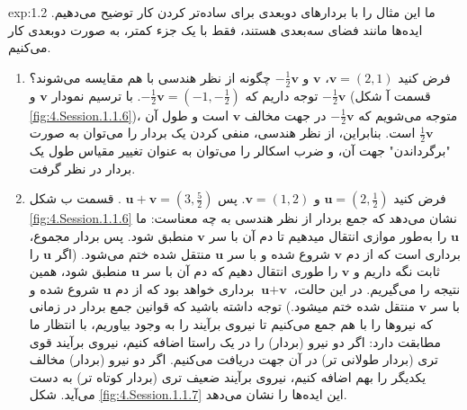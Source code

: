 {\begin{spacing}{1.5}
        \textbf{\vspace{-20pt}}
        \begin{example}{exp:1.2}
            \Large
            ما این مثال را با بردارهای دوبعدی برای ساده‌تر کردن کار توضیح می‌دهیم. ایده‌ها مانند فضای سه‌بعدی هستند، فقط با یک جزء کمتر، به صورت دو‌بعدی کار می‌کنیم.\\
            \begin{enumerate}[label=\textbf{\arabic*}.]
                \item {فرض کنید $\textbf{v}=(2,1)$، $\textbf{v}$ و $-\frac{\displaystyle 1}{\displaystyle 2}\textbf{v}$ چگونه از نظر هندسی با هم مقایسه می‌شوند؟
                توجه داریم که $-\frac{\displaystyle 1}{\displaystyle 2}\textbf{v}=(-1,-\frac{\displaystyle 1}{\displaystyle 2})$.
                با ترسیم نمودار $\textbf{v}$ و $-\frac{\displaystyle 1}{\displaystyle 2}\textbf{v}$ (قسمت آ شکل \ref{fig:4.Session.1.1.6})،
                متوجه می‌شویم که $-\frac{\displaystyle 1}{\displaystyle 2}\textbf{v}$ در جهت مخالف $\textbf{v}$ است و طول آن $\frac{\displaystyle 1}{\displaystyle 2}\textbf{v}$ است.
                بنابراین، از نظر هندسی، منفی کردن یک بردار را می‌توان به صورت "برگرداندن" جهت آن،
                و ضرب اسکالر را می‌توان به عنوان تغییر مقیاس طول یک بردار در نظر گرفت.}\\

                \item {فرض کنید $\textbf{u}=(2,\frac{\displaystyle 1}{\displaystyle 2})$ و $\textbf{v}=(1,2)$. پس $\textbf{u}+\textbf{v}=(3,\frac{\displaystyle 5}{\displaystyle 2})$ .
                قسمت ب شکل \ref{fig:4.Session.1.1.6} نشان می‌دهد که جمع بردار از نظر هندسی به چه معناست:
                ما $\textbf{u}$ را به‌طور موازی انتقال میدهیم تا دم آن با سر $\textbf{v}$ منطبق شود.
                پس بردار مجموع، برداری است که از دم $\textbf{v}$ شروع شده و با سر $\textbf{u}$ منتقل شده ختم می‌شود.
                    (اگر $\textbf{u}$ را ثابت نگه داریم و $\textbf{v}$ را طوری انتقال دهیم که دم آن با سر $\textbf{u}$ منطبق شود، همین نتیجه را می‌گیریم.
                    در این حالت، $\textbf{u}+\textbf{v}$ برداری خواهد بود که از دم $\textbf{u}$ شروع شده و با سر $\textbf{v}$ منتقل شده ختم میشود.)
                    توجه داشته باشید که قوانین جمع بردار در زمانی که نیروها را با هم جمع می‌کنیم تا نیروی برآیند را به وجود بیاوریم، با انتظار ما مطابقت دارد:
                    اگر دو نیرو (بردار) را در یک راستا اضافه کنیم، نیروی برآیند قوی تری (بردار طولانی تر) در آن جهت دریافت می‌کنیم.
                    اگر دو نیرو (بردار) مخالف یکدیگر را بهم اضافه کنیم، نیروی برآیند ضعیف تری (بردار کوتاه تر) به دست می‌آید.
                    شکل \ref{fig:4.Session.1.1.7} این ایده‌ها را نشان می‌دهد.}\\


\end{enumerate}
\end{example}
\end{spacing}}
